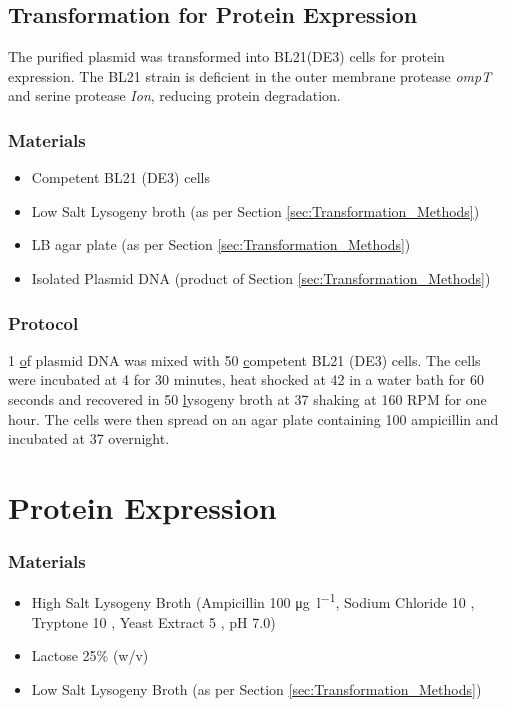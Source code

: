 	\newpage
	
		\subsection*{Transformation for Protein Expression}\label{sec:Transformation_Methods}
		The purified plasmid was transformed into BL21(DE3) \ecoli cells for protein expression. The BL21 \ecoli strain is deficient in the outer membrane protease \textit{ompT} and serine protease \textit{Ion}, reducing protein degradation.
		\subsubsection{Materials}
			\begin{itemize}
			\item Competent BL21 (DE3) \ecoli cells
			\item Low Salt Lysogeny broth (as per Section \ref{sec:Transformation_Methods})
			\item LB agar plate (as per Section \ref{sec:Transformation_Methods})
			\item Isolated Plasmid DNA (product of Section \ref{sec:Transformation_Methods}) 
			\end{itemize}
		
		\subsubsection{Protocol}
		
			1 \ul of plasmid DNA was mixed with 50 \ul competent BL21 (DE3) \ecoli cells. The cells were incubated at 4 \degrees for 30 minutes, heat shocked at 42 \degrees in a water bath for 60 seconds and recovered in 50 \ul lysogeny broth at 37 \degrees shaking at 160 RPM for one hour. The cells were then spread on an agar plate containing 100 \ugl ampicillin and incubated at 37 \degrees overnight.
					
		\newpage	
		
	\section{Protein Expression}
	
		\subsubsection{Materials}
			\begin{itemize}
			\item High Salt Lysogeny Broth (Ampicillin 100 \si{\micro\gram\per\litre}, Sodium Chloride 10 \gl, Tryptone 10 \gl, Yeast Extract 5 \gl, pH 7.0)
			\item Lactose 25\% (w/v)
			\item Low Salt Lysogeny Broth (as per Section \ref{sec:Transformation_Methods})
			\end{itemize}
		
